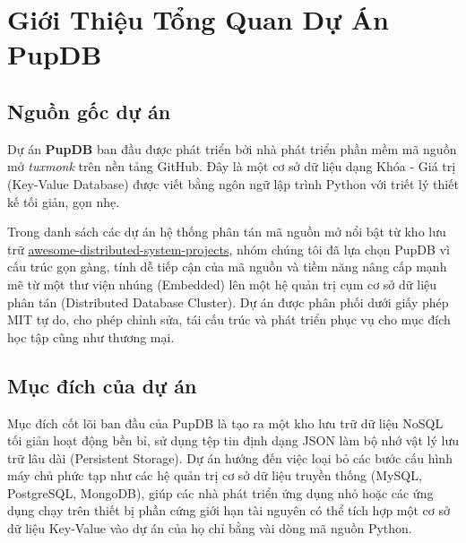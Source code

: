 \documentclass[12pt,a4paper]{report}
\begin{document}
\chapter{Giới Thiệu Tổng Quan Dự Án PupDB}
\section{Nguồn gốc dự án}
Dự án \textbf{PupDB} ban đầu được phát triển bởi nhà phát triển phần mềm mã nguồn mở \textit{tuxmonk} trên nền tảng GitHub. Đây là một cơ sở dữ liệu dạng Khóa - Giá trị (Key-Value Database) được viết bằng ngôn ngữ lập trình Python với triết lý thiết kế tối giản, gọn nhẹ. 

Trong danh sách các dự án hệ thống phân tán mã nguồn mở nổi bật từ kho lưu trữ \href{https://github.com/roma-glushko/awesome-distributed-system-projects}{awesome-distributed-system-projects}, nhóm chúng tôi đã lựa chọn PupDB vì cấu trúc gọn gàng, tính dễ tiếp cận của mã nguồn và tiềm năng nâng cấp mạnh mẽ từ một thư viện nhúng (Embedded) lên một hệ quản trị cụm cơ sở dữ liệu phân tán (Distributed Database Cluster). Dự án được phân phối dưới giấy phép MIT tự do, cho phép chỉnh sửa, tái cấu trúc và phát triển phục vụ cho mục đích học tập cũng như thương mại.

\section{Mục đích của dự án}
Mục đích cốt lõi ban đầu của PupDB là tạo ra một kho lưu trữ dữ liệu NoSQL tối giản hoạt động bền bỉ, sử dụng tệp tin định dạng JSON làm bộ nhớ vật lý lưu trữ lâu dài (Persistent Storage). Dự án hướng đến việc loại bỏ các bước cấu hình máy chủ phức tạp như các hệ quản trị cơ sở dữ liệu truyền thống (MySQL, PostgreSQL, MongoDB), giúp các nhà phát triển ứng dụng nhỏ hoặc các ứng dụng chạy trên thiết bị phần cứng giới hạn tài nguyên có thể tích hợp một cơ sở dữ liệu Key-Value vào dự án của họ chỉ bằng vài dòng mã nguồn Python.
\end{document}
